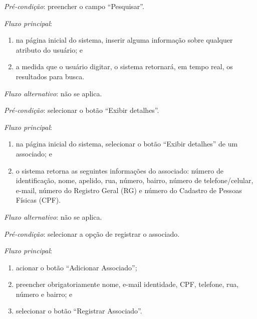 \vspace{0.7cm}

\noindent \textit{Pré-condição}: preencher o campo ``Pesquisar''.

\noindent \textit{Fluxo principal}:

\begin{enumerate}
    \item na página inicial do sistema, inserir alguma informação sobre qualquer atributo do usuário; e
    \item a medida que o usuário digitar, o sistema retornará, em tempo real, os resultados para busca.
\end{enumerate}

\noindent \textit{Fluxo alternativo}: não se aplica.


\vspace{0.7cm}

\noindent \textit{Pré-condição}: selecionar o botão ``Exibir detalhes''.

\noindent \textit{Fluxo principal}:

\begin{enumerate}
    \item na página inicial do sistema, selecionar o botão ``Exibir detalhes'' de um associado; e
    \item o sistema retorna as seguintes informações do associado: número de identificação, nome, apelido, rua, número, bairro, número de telefone/celular, e-mail, número do Registro Geral (RG) e número do Cadastro de Pessoas Físicas (CPF).
\end{enumerate}

\noindent \textit{Fluxo alternativo}: não se aplica.


\vspace{0.7cm}

\noindent \textit{Pré-condição}: selecionar a opção de registrar o associado.

\noindent \textit{Fluxo principal}:

\begin{enumerate}
    \item acionar o botão ``Adicionar Associado'';
    \item preencher obrigatoriamente nome, e-mail identidade, CPF, telefone, rua, número e bairro; e
    \item selecionar o botão ``Registrar Associado''.
\end{enumerate}

